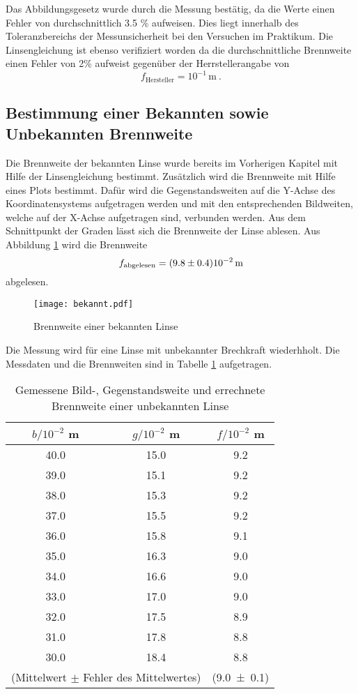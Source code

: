 Das Abbildungsgesetz wurde durch die Messung bestätig, da die Werte einen Fehler von durchschnittlich 3.5 \% aufweisen. Dies liegt innerhalb des Toleranzbereichs der Messunsicherheit bei den Versuchen im Praktikum. Die Linsengleichung ist ebenso verifiziert worden da die durchschnittliche Brennweite einen Fehler von 2\% aufweist gegenüber der Herrstellerangabe von 
\begin{equation}
  f_\text{Hersteller} = 10^{-1} \, \text{m} \ .
  \label{eqn:fHer1}
\end{equation}
\subsection{Bestimmung einer Bekannten sowie Unbekannten Brennweite}
Die Brennweite der bekannten Linse wurde bereits im Vorherigen Kapitel mit Hilfe der Linsengleichung bestimmt. Zusätzlich wird die Brennweite mit Hilfe eines Plots bestimmt. Dafür wird die Gegenstandsweiten auf die Y-Achse des Koordinatensystems aufgetragen werden und mit den entsprechenden Bildweiten, welche auf der X-Achse aufgetragen sind, verbunden werden. Aus dem Schnittpunkt der Graden lässt sich die Brennweite der Linse ablesen. Aus Abbildung \ref{fig:fibek} wird die Brennweite
\begin{equation}
  f_\text{abgelesen} = (\num{9.8 +- 0.4}) 10^{-2} \, \text{m}
  \label{eqn:fbek}
\end{equation}
abgelesen. 
\begin{figure}
  \centering
  \texttt{[image: bekannt.pdf]}
  \caption{Brennweite einer bekannten Linse}
  \label{fig:fibek}
\end{figure}
Die Messung wird für eine Linse mit unbekannter Brechkraft wiederhholt. Die Messdaten und die Brennweiten sind in Tabelle \ref{tab:funb} aufgetragen.
\begin{table}
  \centering
  \begin{tabular}{c c| c}
    \toprule
    $b/10^{-2}$ m & $g/10^{-2}$ m & $f/10^{-2}$ m\\
    \midrule
	40.0	& 15.0	& 9.2	\\
	39.0	& 15.1	& 9.2	\\
	38.0	& 15.3	& 9.2	\\
	37.0	& 15.5	& 9.2	\\
	36.0	& 15.8	& 9.1	\\
	35.0	& 16.3	& 9.0	\\
	34.0	& 16.6	& 9.0	\\
	33.0	& 17.0	& 9.0	\\
	32.0	& 17.5	& 8.9	\\
	31.0	& 17.8	& 8.8	\\
	30.0	& 18.4	& 8.8	\\
    \midrule
    	\multicolumn{2}{r|}{(Mittelwert $\pm$ Fehler des Mittelwertes)}&(\num {9.0 +- 0.1})\\
    \bottomrule
  \end{tabular}
  \caption{Gemessene Bild-, Gegenstandsweite und errechnete Brennweite einer unbekannten Linse}
  \label{tab:funb}
\end{table}
